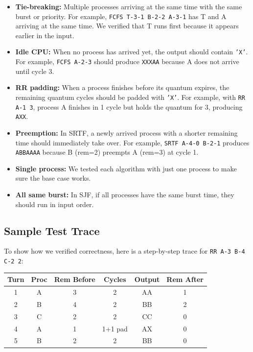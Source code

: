 \documentclass[a4paper,12pt]{article}
\begin{document}
\begin{itemize}
    \item \textbf{Tie-breaking:} Multiple processes arriving at the same time with the same burst or priority. For example, \texttt{FCFS T-3-1 B-2-2 A-3-1} has T and A arriving at the same time. We verified that T runs first because it appears earlier in the input.
    \item \textbf{Idle CPU:} When no process has arrived yet, the output should contain \texttt{'X'}. For example, \texttt{FCFS A-2-3} should produce \texttt{XXXAA} because A does not arrive until cycle 3.
    \item \textbf{RR padding:} When a process finishes before its quantum expires, the remaining quantum cycles should be padded with \texttt{'X'}. For example, with \texttt{RR A-1 3}, process A finishes in 1 cycle but holds the quantum for 3, producing \texttt{AXX}.
    \item \textbf{Preemption:} In SRTF, a newly arrived process with a shorter remaining time should immediately take over. For example, \texttt{SRTF A-4-0 B-2-1} produces \texttt{ABBAAAA} because B (rem=2) preempts A (rem=3) at cycle 1.
    \item \textbf{Single process:} We tested each algorithm with just one process to make sure the base case works.
    \item \textbf{All same burst:} In SJF, if all processes have the same burst time, they should run in input order.
\end{itemize}

\subsection{Sample Test Trace}

To show how we verified correctness, here is a step-by-step trace for \texttt{RR A-3 B-4 C-2 2}:

\begin{center}
\begin{tabular}{|c|c|c|c|c|c|}
\hline
\textbf{Turn} & \textbf{Proc} & \textbf{Rem Before} & \textbf{Cycles} & \textbf{Output} & \textbf{Rem After} \\
\hline
1 & A & 3 & 2 & AA & 1 \\
2 & B & 4 & 2 & BB & 2 \\
3 & C & 2 & 2 & CC & 0 \\
4 & A & 1 & 1+1 pad & AX & 0 \\
5 & B & 2 & 2 & BB & 0 \\
\hline
\end{tabular}
\end{center}
\end{document}
